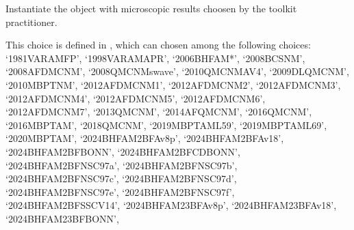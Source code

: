 \documentclass[letterpaper,10pt,english]{sphinxmanual}
\begin{document}
\begin{fulllineitems}
\label{\detokenize{source/api/setup_micro:nucleardatapy.setup_micro.SetupMicro}}
\pysigstartsignatures
{}
\pysigstopsignatures
\sphinxAtStartPar
Instantiate the object with microscopic results choosen     by the toolkit practitioner.

\sphinxAtStartPar
This choice is defined in , which can chosen among     the following choices:     ‘1981\sphinxhyphen{}VAR\sphinxhyphen{}AM\sphinxhyphen{}FP’, ‘1998\sphinxhyphen{}VAR\sphinxhyphen{}AM\sphinxhyphen{}APR’, ‘2006\sphinxhyphen{}BHF\sphinxhyphen{}AM*’, ‘2008\sphinxhyphen{}BCS\sphinxhyphen{}NM’, ‘2008\sphinxhyphen{}AFDMC\sphinxhyphen{}NM’,     ‘2008\sphinxhyphen{}QMC\sphinxhyphen{}NM\sphinxhyphen{}swave’, ‘2010\sphinxhyphen{}QMC\sphinxhyphen{}NM\sphinxhyphen{}AV4’, ‘2009\sphinxhyphen{}DLQMC\sphinxhyphen{}NM’, ‘2010\sphinxhyphen{}MBPT\sphinxhyphen{}NM’,     ‘2012\sphinxhyphen{}AFDMC\sphinxhyphen{}NM\sphinxhyphen{}1’, ‘2012\sphinxhyphen{}AFDMC\sphinxhyphen{}NM\sphinxhyphen{}2’, ‘2012\sphinxhyphen{}AFDMC\sphinxhyphen{}NM\sphinxhyphen{}3’, ‘2012\sphinxhyphen{}AFDMC\sphinxhyphen{}NM\sphinxhyphen{}4’,     ‘2012\sphinxhyphen{}AFDMC\sphinxhyphen{}NM\sphinxhyphen{}5’, ‘2012\sphinxhyphen{}AFDMC\sphinxhyphen{}NM\sphinxhyphen{}6’, ‘2012\sphinxhyphen{}AFDMC\sphinxhyphen{}NM\sphinxhyphen{}7’,     ‘2013\sphinxhyphen{}QMC\sphinxhyphen{}NM’, ‘2014\sphinxhyphen{}AFQMC\sphinxhyphen{}NM’, ‘2016\sphinxhyphen{}QMC\sphinxhyphen{}NM’, ‘2016\sphinxhyphen{}MBPT\sphinxhyphen{}AM’,     ‘2018\sphinxhyphen{}QMC\sphinxhyphen{}NM’, ‘2019\sphinxhyphen{}MBPT\sphinxhyphen{}AM\sphinxhyphen{}L59’, ‘2019\sphinxhyphen{}MBPT\sphinxhyphen{}AM\sphinxhyphen{}L69’,     ‘2020\sphinxhyphen{}MBPT\sphinxhyphen{}AM’,     ‘2024\sphinxhyphen{}BHF\sphinxhyphen{}AM\sphinxhyphen{}2BF\sphinxhyphen{}Av8p’, ‘2024\sphinxhyphen{}BHF\sphinxhyphen{}AM\sphinxhyphen{}2BF\sphinxhyphen{}Av18’, ‘2024\sphinxhyphen{}BHF\sphinxhyphen{}AM\sphinxhyphen{}2BF\sphinxhyphen{}BONN’, ‘2024\sphinxhyphen{}BHF\sphinxhyphen{}AM\sphinxhyphen{}2BF\sphinxhyphen{}CDBONN’,     ‘2024\sphinxhyphen{}BHF\sphinxhyphen{}AM\sphinxhyphen{}2BF\sphinxhyphen{}NSC97a’, ‘2024\sphinxhyphen{}BHF\sphinxhyphen{}AM\sphinxhyphen{}2BF\sphinxhyphen{}NSC97b’, ‘2024\sphinxhyphen{}BHF\sphinxhyphen{}AM\sphinxhyphen{}2BF\sphinxhyphen{}NSC97c’, ‘2024\sphinxhyphen{}BHF\sphinxhyphen{}AM\sphinxhyphen{}2BF\sphinxhyphen{}NSC97d’,     ‘2024\sphinxhyphen{}BHF\sphinxhyphen{}AM\sphinxhyphen{}2BF\sphinxhyphen{}NSC97e’, ‘2024\sphinxhyphen{}BHF\sphinxhyphen{}AM\sphinxhyphen{}2BF\sphinxhyphen{}NSC97f’, ‘2024\sphinxhyphen{}BHF\sphinxhyphen{}AM\sphinxhyphen{}2BF\sphinxhyphen{}SSCV14’,     ‘2024\sphinxhyphen{}BHF\sphinxhyphen{}AM\sphinxhyphen{}23BF\sphinxhyphen{}Av8p’, ‘2024\sphinxhyphen{}BHF\sphinxhyphen{}AM\sphinxhyphen{}23BF\sphinxhyphen{}Av18’, ‘2024\sphinxhyphen{}BHF\sphinxhyphen{}AM\sphinxhyphen{}23BF\sphinxhyphen{}BONN’, 
\end{fulllineitems}
\end{document}
